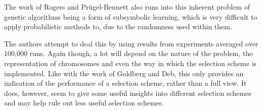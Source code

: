 \documentclass[10pt, a4paper]{article}
\begin{document}
The work of Rogers and Pr\"{u}gel-Bennett\cite{Rogers1999Genetic} also runs 
into this inherent problem of genetic algorithms being a form of subsymbolic 
learning, which is very difficult to apply probabilistic methods to, due to the
randomness used within them.

The authors attempt to deal this by using results from experiments averaged 
over 100,000 runs. Again though, a lot will depend on the nature of the 
problem, the representation of chromosomes and even the way in which the
selection scheme is implemented. Like with the work of Goldberg and Deb, this 
only provides an indication of the performance of a selection scheme, rather
than a full view. It does, however, seem to give some useful insights into 
different selection schemes and may help rule out less useful selection 
schemes.


\newpage


\end{document}
